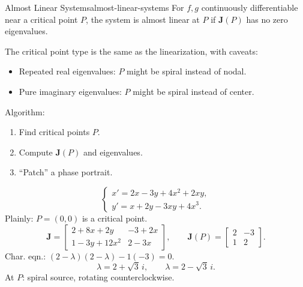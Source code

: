 \begin{theorem}{Almost Linear Systems}{almost-linear-systems}
  For $f,g$ continuously differentiable near a critical point $P$, the system is
  almost linear at $P$ if $\mathbf{J}(P)$ has no zero eigenvalues.

  The critical point type is the same as the linearization, with caveats:
  \begin{itemize}
    \item Repeated real eigenvalues: $P$ might be spiral instead of nodal.
    \item Pure imaginary eigenvalues: $P$ might be spiral instead of center.
  \end{itemize}
\end{theorem}

Algorithm:
\begin{enumerate}
  \item Find critical points $P$.
  \item Compute $\mathbf{J}(P)$ and eigenvalues.
  \item ``Patch'' a phase portrait.
\end{enumerate}

\begin{example}
  \[
    \begin{cases}
      x'=2x-3y+4x^2+2xy, \\
      y'=x+2y-3xy+4x^3.
    \end{cases}
  \]
  Plainly: $P=(0,0)$ is a critical point.
  \[
    \mathbf{J}=
    \begin{bmatrix}
      2+8x+2y & -3+2x \\1-3y+12x^2&2-3x
    \end{bmatrix}
    ,
    \qquad \mathbf{J}(P)=
    \begin{bmatrix}
      2 & -3 \\1&2
    \end{bmatrix}
    .
  \]
  Char. eqn.: $(2-\lambda)(2-\lambda)-1(-3)=0$.
  \[
    \lambda=2+\sqrt3\,i,\qquad\lambda=2-\sqrt3\,i.
  \]
  At $P$: spiral source, rotating counterclockwise.
\end{example}

